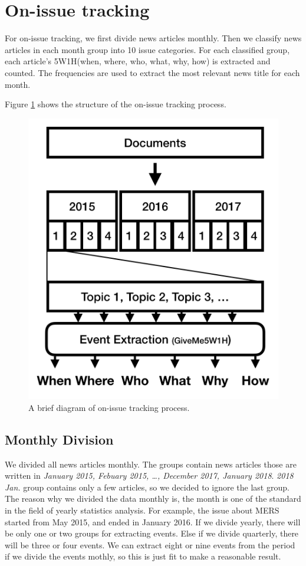 \section{On-issue tracking}

For on-issue tracking, we first divide news articles monthly.
Then we classify news articles in each month group into 10 issue categories.
For each classified group, each article’s 5W1H(when, where, who, what, why, how) is extracted and counted.
The frequencies are used to extract the most relevant news title for each month.

Figure \ref{fig:onissuedia} shows the structure of the on-issue tracking process.

\begin{figure}[!htbp]
  \centering
  \includegraphics[width=0.8\linewidth]{on_issue_1.png}
  \caption{A brief diagram of on-issue tracking process.}
  \label{fig:onissuedia}
\end{figure}

\subsection{Monthly Division}

We divided all news articles monthly.
The groups contain news articles those are written in \textit{January 2015, Febuary 2015, \dots, December 2017, January 2018}.
\textit{2018 Jan.} group contains only a few articles,
so we decided to ignore the last group.
The reason why we divided the data monthly is, the month is one of the standard in the field of yearly statistics analysis.
For example, the issue about MERS started from May 2015, and ended in January 2016.
If we divide yearly, there will be only one or two groups for extracting events.
Else if we divide quarterly, there will be three or four events.
We can extract eight or nine events from the period if we divide the events mothly,
so this is just fit to make a reasonable result.

